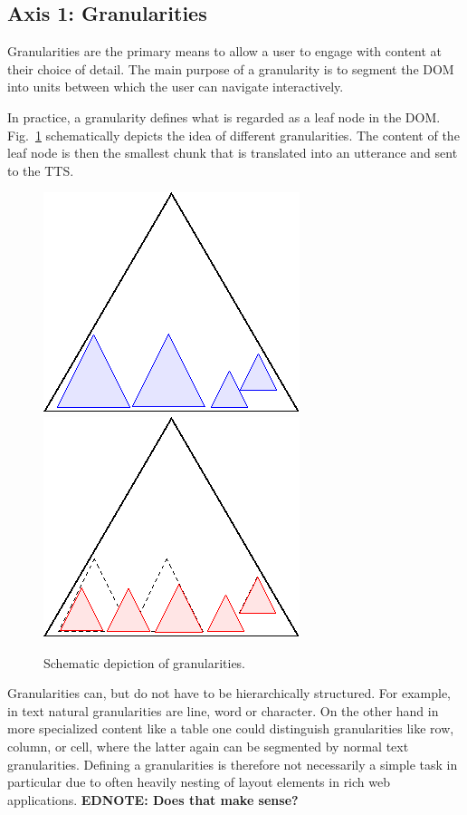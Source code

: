 \documentclass{sig-alternate}
\newcommand\ednote[1]{\typeout{There is still a note!!!}%
  {\bf EDNOTE: #1}}
\begin{document}
\subsection{Axis 1: Granularities}
\label{sec:ax1}

Granularities are the primary means to allow a user to engage with content at
their choice of detail. The main purpose of a granularity is to segment the DOM
into units between which the user can navigate interactively.

In practice, a granularity defines what is regarded as a leaf node in the
DOM. Fig.~\ref{fig:granularity} schematically depicts the idea of different
granularities. The content of the leaf node is then the smallest chunk that is
translated into an utterance and sent to the TTS.

\begin{figure}[ht!]
  \begin{center}
    \leavevmode
    \includegraphics[width=.4\columnwidth]{images/granularity1}
    \includegraphics[width=.4\columnwidth]{images/granularity2}
    \caption{Schematic depiction of granularities.}
    \label{fig:granularity}
  \end{center}
\end{figure}

Granularities can, but do not have to be hierarchically structured. For example,
in text natural granularities are line, word or character. On the other
hand in more specialized content like a table one could distinguish
granularities like row, column, or cell, where the latter again can be
segmented by normal text granularities.  Defining a granularities is therefore
not necessarily a simple task in particular due to often heavily nesting of
layout elements in rich web applications.\ednote{Does that make sense?}
\end{document}
